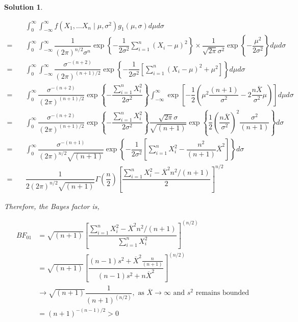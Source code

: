 \documentclass[12pt]{article}
\theoremstyle{problemstyle}
\newtheorem*{solution*}{Solution}
\begin{document}
\begin{solution*}
\begin{enumerate}
        \begin{align*}
            & \int_{0}^\infty \int_{-\infty}^\infty f(X_1, \dots X_n \mid \mu, \sigma^2) g_1(\mu, \sigma)d\mu d\sigma\\
            = \quad & \int_{0}^\infty \int_{-\infty}^\infty \dfrac{1}{(2\pi)^{n/2} \sigma^{n}} \exp\left\{ -\dfrac{1}{2\sigma^2}\sum_{i=1}^n (X_i - \mu)^2 \right\} \times \dfrac{1}{\sqrt{2\pi}\sigma^2} \exp\left\{ -\dfrac{\mu^2}{2\sigma^2} \right\} d\mu d\sigma \\
            = \quad & \int_{0}^\infty \int_{-\infty}^\infty \dfrac{\sigma^{-(n+2)}}{(2\pi)^{(n+1)/2}} \exp\left\{ -\dfrac{1}{2\sigma^2} \left[ \sum_{i=1}^n (X_i - \mu)^2 + \mu^2 \right] \right\} d\mu d\sigma \\
            = \quad & \int_{0}^\infty \dfrac{\sigma^{-(n+2)}}{(2\pi)^{(n+1)/2}} \exp\left\{ -\dfrac{\sum_{i=1}^n X_i^2}{2\sigma^2} \right\} \int_{-\infty}^\infty \exp\left[ -\dfrac{1}{2}\left( \mu^2 \dfrac{(n+1)}{\sigma^2} - 2\dfrac{n\overline{X}}{\sigma^2}\mu \right) \right] d\mu d\sigma\\
            = \quad & \int_{0}^\infty \dfrac{\sigma^{-(n+2)}}{(2\pi)^{(n+1)/2}} \exp\left\{ -\dfrac{\sum_{i=1}^n X_i^2}{2\sigma^2} \right\} \dfrac{\sqrt{2\pi}\sigma}{\sqrt{(n+1)}} \exp\left\{ \dfrac{1}{2}\left( \dfrac{n \overline{X}}{\sigma^2} \right)^2 \dfrac{\sigma^2}{(n+1)} \right\}d\sigma\\
            = \quad & \int_{0}^\infty \dfrac{\sigma^{-(n+1)}}{(2\pi)^{n/2} \sqrt{(n+1)}} \exp\left\{ -\dfrac{1}{2\sigma^2} \left[ \sum_{i=1}^n X_i^2 - \dfrac{n^2}{(n+1)} \overline{X}^2 \right] \right\} d\sigma\\
            = \quad & \dfrac{1}{2(2\pi)^{n/2}\sqrt{(n+1)}} \Gamma\left( \dfrac{n}{2} \right) \left[ \dfrac{\sum_{i=1}^n X_i^2 - \overline{X}^2 n^2/(n+1)}{2} \right]^{n/2}
        \end{align*}

        Therefore, the Bayes factor is,

        \begin{align*}
            BF_{01}
            & = \sqrt{(n+1)} \left[ \dfrac{\sum_{i=1}^n X_i^2 - \overline{X}^2 n^2/(n+1)}{\sum_{i=1}^n X_i^2} \right]^{(n/2)}\\
            & = \sqrt{(n+1)} \left[ \dfrac{(n-1)s^2 + \overline{X}^2 \frac{n}{(n+1)} }{ (n-1)s^2 + n \overline{X}^2 } \right]^{(n/2)}\\
            & \rightarrow \sqrt{(n+1)} \dfrac{1}{(n+1)^{(n/2)}}, \text{ as } \overline{X} \rightarrow \infty \text{ and } s^2 \text{ remains bounded}\\
            & = (n+1)^{-(n-1)/2} > 0
        \end{align*}


\end{enumerate}
\end{solution*}
\end{document}
